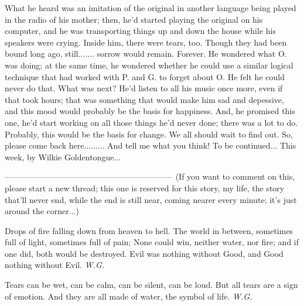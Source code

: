 What he heard was an imitation of the original in another language being played in the radio of his mother; then, he'd started playing the original on his computer, and he was transporting things up and down the house while his speakers were crying. 
Inside him, there were tears, too. Though they had been bound long ago, still....... sorrow would remain. Forever. 
He wondered what O. was doing; at the same time, he wondered whether he could use a similar logical technique that had worked with P. and G. to forget about O. He felt he could never do that. What was next? He'd listen to all his music once more, even if that took hours; that was something that would make him sad and depessive, and this mood would probably be the basis for happiness. And, he promised this one, he'd start working on all those things he'd never done; there was a lot to do. 
Probably, this would be the basis for change. 
We all should wait to find out. 
So, please come back here.........
And tell me what you think!
To be continued...
This week, by Wilkie Goldentongue...

--------------------------------------------------------------
(If you want to comment on this, please start a new thread; this one is reserved for this story, my life, the story that'll never end, while the end is still near, coming nearer every minute; it's just around the corner...)

Drops of fire 
falling down 
from heaven to hell. 
The world in between, 
sometimes full of light, 
sometimes full of pain; 
None could win, 
neither water, 
nor fire; 
and if one did, 
both would be destroyed. 
Evil was nothing without Good, 
and Good nothing without Evil. 
\emph{W.G.}

Tears 
can be wet, 
can be calm, 
can be silent, 
can be loud. 
But all tears are a sign 
of emotion. 
And they are all made of water, 
the symbol of life. 
\emph{W.G.}

